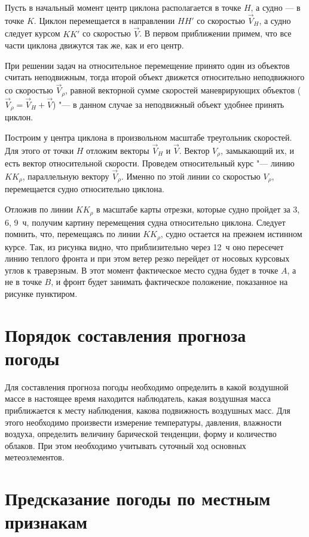 \documentclass[a4paper, 12pt, twoside, final, book, russian, fittopage, cyremdash, openright]{ncc}
\begin{document}
Пусть в начальный момент центр циклона располагается в точке $H$, а
судно — в точке $K$. Циклон перемещается в направлении $HH'$ со скоростью
$\vec{V}_H$, а судно следует курсом $KK'$ со скоростью $\vec{V}$. В первом приближении
примем, что все части циклона движутся так же, как и его центр.

При решении задач на относительное перемещение принято один из
объектов считать неподвижным, тогда второй объект движется
относительно неподвижного со скоростью $\vec{V}_\rho$, равной
векторной сумме скоростей маневрирующих объектов
($\vec{V}_\rho = \vec{V}_H + \vec{V}$) "--- в данном случае за
неподвижный объект удобнее принять циклон.

Построим у центра циклона в произвольном масштабе треугольник
скоростей. Для этого от точки $H$ отложим векторы $\vec{V}_H$ и
$\vec{V}$. Вектор $V_\rho$, замыкающий их, и есть вектор относительной
скорости. Проведем относительный курс "--- линию $KK_\rho$,
параллельную вектору $\vec{V}_\rho$. Именно по этой линии со скоростью
$V_\rho$, перемещается судно относительно циклона.

Отложив по линии $KK_\rho$ в масштабе карты отрезки, которые судно
пройдет за 3, 6, 9~ч, получим картину перемещения судна относительно
циклона. Следует помнить, что, перемещаясь по линии $KK_\rho$, судно
остается на прежнем истинном курсе. Так, из рисунка видно, что
приблизительно через 12~ч оно пересечет линию теплого фронта и при
этом ветер резко перейдет от носовых курсовых углов к траверзным. В
этот момент фактическое место судна будет в точке $A$, а не в точке
$B$, и фронт будет занимать фактическое положение, показанное на
рисунке пунктиром.

\section{Порядок составления прогноза погоды}

Для составления прогноза погоды необходимо определить в какой
воздушной массе в настоящее время находится наблюдатель, какая
воздушная масса приближается к месту наблюдения, какова подвижность
воздушных масс. Для этого необходимо произвести измерение температуры,
давления, влажности воздуха, определить величину барической тенденции,
форму и количество облаков. При этом необходимо учитывать суточный ход
основных метеоэлементов.

\section{Предсказание погоды по местным признакам}
\end{document}
